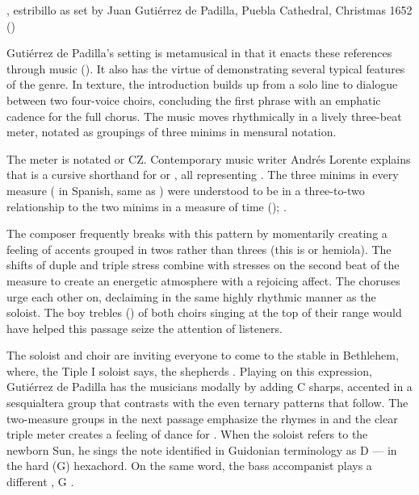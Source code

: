 {, estribillo as set by Juan Gutiérrez
de Padilla, Puebla Cathedral, Christmas 1652 
()}

Gutiérrez de Padilla's setting is metamusical in that it enacts these
references through music ().
It also has the virtue of demonstrating several typical features of the genre.
In texture, the introduction builds up from a solo line to dialogue between two
four-voice choirs, concluding the first phrase with an emphatic cadence for the
full chorus.
The music moves rhythmically in a lively three-beat meter, notated as groupings
of three minims in mensural notation.%
\begin{Footnote}
    The meter is notated \meterCZ{} or CZ.
    Contemporary music writer Andrés Lorente explains that \meterCZ{} is a
    cursive shorthand for \meterCThreeTwo{} or \meterCThree, all representing
    .
    The three minims in every measure ( in Spanish, same as
    ) were understood to be in a three-to-two relationship to the
    two minims in a measure of \meterC{} time ();
    \autocites
    [156, 165, 210]{Lorente:Porque}
    [537]{Cerone:Melopeo}.
\end{Footnote}
The composer frequently breaks with this pattern by momentarily creating a
feeling of accents grouped in twos rather than threes (this is
 or hemiola).
The shifts of duple and triple stress combine with stresses on the second beat
of the measure to create an energetic atmosphere with a rejoicing affect.  
The choruses urge each other on, declaiming in the same highly rhythmic manner
as the soloist.
The boy trebles () of both choirs singing at the top of their
range would have helped this passage seize the attention of listeners.


The soloist and choir are inviting everyone to come to the stable in Bethlehem,
where, the Tiple I soloist says, the shepherds .
Playing on this expression, Gutiérrez de Padilla has the musicians
 modally by adding C sharps, accented in a sesquialtera group that
contrasts with the even ternary patterns that follow.
The two-measure groups in the next passage emphasize the rhymes in
 and the clear triple meter creates a
feeling of dance for .
When the soloist refers to the newborn Sun, he sings the note identified in
Guidonian terminology as D --- in the hard (G)
hexachord.  
On the same word, the bass accompanist plays a different , G
.

